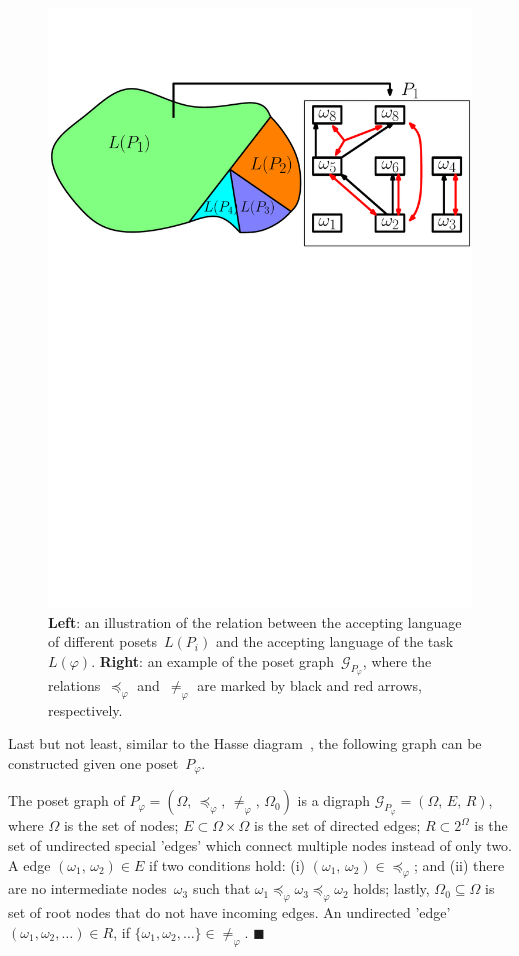 \begin{figure}[t!]
	\includegraphics[width=0.8\linewidth]{figures/poset_language2.pdf}
	\centering
\caption{\textbf{Left}:
an illustration of the relation between the accepting
language of different posets~$L(P_i)$
and the accepting language of the task~$L(\varphi)$.
\textbf{Right}:
an example of the poset graph~$\mathcal{G}_{P_\varphi}$,
where the relations~$\preceq_{\varphi}$ and~$\neq_{\varphi}$
are marked by black and red arrows, respectively.}
\label{fig:poset_language}
\end{figure}

Last but not least, similar to the Hasse diagram~\cite{simovici2008mathematical},
the following graph can be constructed given one poset~$P_{\varphi}$.

\begin{definition}
	\label{def:poset-graph}
The poset graph of $P_{\varphi}=(\Omega,\,\preceq_{\varphi},\,\neq_{\varphi},
\,\Omega_0)$ is a digraph $\mathcal{G}_{P_\varphi}=(\Omega,\,E,\,R)$,
where $\Omega$ is the set of nodes;
$E\subset \Omega \times \Omega$ is the set of directed edges;
$R\subset 2^\Omega$ is the set of undirected special 'edges' which 
connect multiple nodes instead of only two.
A edge $(\omega_1,\,\omega_2)\in E$ if two conditions hold:
(i) $(\omega_1,\, \omega_2)\in \preceq_{\varphi}$;
{and} (ii) there are no intermediate nodes~$\omega_3$ such that
$\omega_1\preceq_{\varphi} \omega_3 \preceq_{\varphi} \omega_2$ holds;
lastly, $\Omega_0\subseteq \Omega$ is set of root nodes that do not have
incoming edges. An undirected 'edge' $(\omega_1,\omega_2,\dots)\in R$, if $\{\omega_1,\omega_2,\dots\}\in \neq_{\varphi}$.
\hfill $\blacksquare$
 \end{definition}

